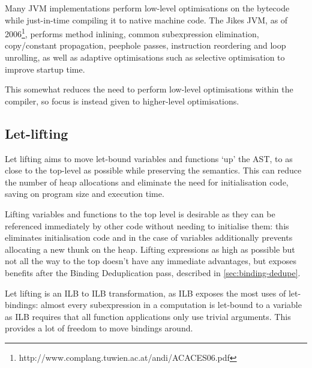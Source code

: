 \documentclass[dissertation.tex]{subfiles}
\begin{document}
{

    Many JVM implementations perform low-level optimisations on the bytecode while just-in-time compiling it to
    native machine code. The Jikes JVM, as of 2006\footnote{http://www.complang.tuwien.ac.at/andi/ACACES06.pdf},
    performs method inlining, common subexpression elimination, copy/constant propagation, peephole passes,
    instruction reordering and loop unrolling, as well as adaptive optimisations such as selective optimisation to
    improve startup time.

    This somewhat reduces the need to perform low-level optimisations within the compiler, so focus is instead given
    to higher-level optimisations.

    \subsection{Let-lifting}
    {

        Let lifting aims to move let-bound variables and functions `up' the AST, to as close to the top-level as
        possible while preserving the semantics. This can reduce the number of heap allocations and eliminate the
        need for initialisation code, saving on program size and execution time.

        
        Lifting variables and functions to the top level is desirable as they can be referenced immediately by other
        code without needing to initialise them: this eliminates initialisation code and in the case of variables
        additionally prevents allocating a new thunk on the heap. Lifting expressions as high as possible but not
        all the way to the top doesn't have any immediate advantages, but exposes benefits after the Binding
        Deduplication pass, described in \ref{sec:binding-dedupe}.

        Let lifting is an ILB to ILB transformation, as ILB exposes the most uses of let-bindings: almost every
        subexpression in a computation is let-bound to a variable as ILB requires that all function applications
        only use trivial arguments. This provides a lot of freedom to move bindings around.


}}
\end{document}
